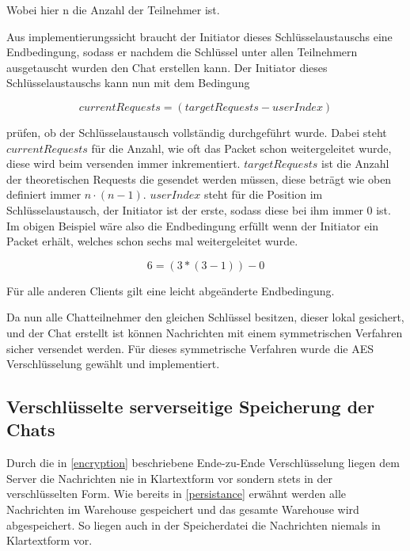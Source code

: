 Wobei hier n die Anzahl der Teilnehmer ist.

Aus implementierungssicht braucht der Initiator dieses
Schlüsselaustauschs eine Endbedingung, sodass er nachdem
die Schlüssel unter allen Teilnehmern ausgetauscht wurden 
den Chat erstellen kann. Der Initiator dieses Schlüsselaustauschs 
kann nun mit dem Bedingung

$$ currentRequests = (targetRequests - userIndex) $$

prüfen, ob der Schlüsselaustausch vollständig durchgeführt wurde. Dabei steht 
$ currentRequests $ für die Anzahl, wie oft das Packet schon weitergeleitet
wurde, diese wird beim versenden immer inkrementiert. $ targetRequests $
ist die Anzahl der theoretischen Requests die gesendet werden müssen, diese
beträgt wie oben definiert immer $ n \cdot (n - 1) $. $ userIndex $ steht
für die Position im Schlüsselaustausch, der Initiator ist der erste, sodass
diese bei ihm immer 0 ist. Im obigen Beispiel wäre also die Endbedingung
erfüllt wenn der Initiator ein Packet erhält, welches schon sechs mal 
weitergeleitet wurde.

$$ 6 = (3 * (3 - 1)) - 0 $$

Für alle anderen Clients gilt eine leicht abgeänderte Endbedingung.

Da nun alle Chatteilnehmer den gleichen Schlüssel besitzen, dieser 
lokal gesichert, und der Chat erstellt ist können Nachrichten mit 
einem symmetrischen Verfahren sicher versendet werden. Für dieses 
symmetrische Verfahren wurde die AES Verschlüsselung gewählt und
implementiert.

\author{Troy Keßler}
\subsection{Verschlüsselte serverseitige Speicherung der Chats}
Durch die in \ref{encryption} beschriebene Ende-zu-Ende Verschlüsselung liegen dem Server die Nachrichten nie in Klartextform vor sondern stets in der verschlüsselten Form. Wie bereits in \ref{persistance} erwähnt werden alle Nachrichten im Warehouse gespeichert und das gesamte Warehouse wird abgespeichert. So liegen auch in der Speicherdatei die Nachrichten niemals in Klartextform vor.
